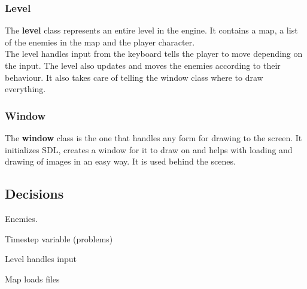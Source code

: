 \subsubsection{Level}
\label{03_01_04}

The \textbf{level} class represents an entire level in the engine. It contains a map, a list of the enemies in the map and the player character. 
\\The level handles input from the keyboard tells the player to move depending on the input. The level also updates and moves the enemies according to their behaviour. It also takes care of telling the window class where to draw everything.

\subsubsection{Window}
\label{03_01_05}

The \textbf{window} class is the one that handles any form for drawing to the screen. It initializes SDL, creates a window for it to draw on and helps with loading and drawing of images in an easy way. It is used behind the scenes.

\subsection{Decisions}
\label{03_02}

Enemies.

Timestep variable (problems)

Level handles input

Map loads files

